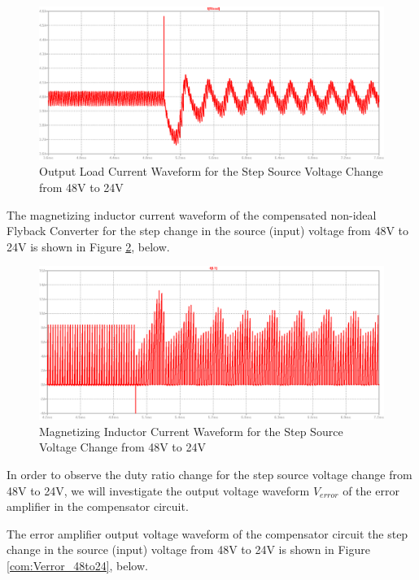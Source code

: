 \begin{figure}[H]
\begin{center}
\includegraphics[width=1\textwidth]{comp_simulations/Iload_48to24.png}
\caption{Output Load Current Waveform for the Step Source Voltage Change from 48V to 24V}
\label{com:Iload_48to24}
\end{center}
\end{figure}

The magnetizing inductor current waveform of the compensated non-ideal Flyback Converter for the step change in the source (input) voltage from 48V to 24V is shown in Figure \ref{com:ILm_48to24}, below.

\begin{figure}[H]
\begin{center}
\includegraphics[width=1\textwidth]{comp_simulations/ILm_48to24.png}
\caption{Magnetizing Inductor Current Waveform for the Step Source Voltage Change from 48V to 24V}
\label{com:ILm_48to24}
\end{center}
\end{figure}

In order to observe the duty ratio change for the step source voltage change from 48V to 24V, we will investigate the output voltage waveform $V_{error}$ of the error amplifier in the compensator circuit.

The error amplifier output voltage waveform of the compensator circuit the step change in the source (input) voltage from 48V to 24V is shown in Figure \ref{com:Verror_48to24}, below.

